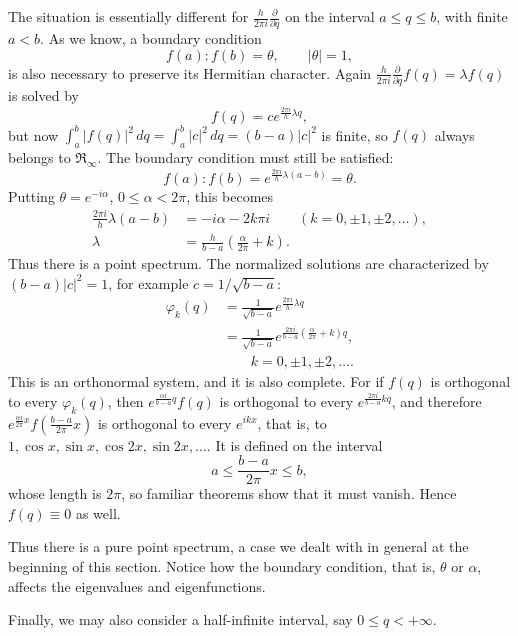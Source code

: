 \documentclass[fontsize=13pt,twoside,openany,headings=normal,parskip=false,bookmarkpackage=false,DIV=calc]{scrbook}
\begin{document}
\hypertarget{origpage-71}{}%
The situation is essentially different for $\frac{h}{2\pi i}\frac{\partial}{\partial q}$ on the interval $a\leq q\leq b$, with finite $a<b$. As we know, a boundary condition
\[
f(a):f(b)=\theta,\qquad|\theta|=1,
\]
is also necessary to preserve its Hermitian character. Again $\frac{h}{2\pi i}\frac{\partial}{\partial q}f(q)=\lambda f(q)$ is solved by
\[
f(q)=c e^{\frac{2\pi i}{h}\lambda q},
\]
but now $\int_a^b|f(q)|^2\,dq=\int_a^b|c|^2\,dq=(b-a)|c|^2$ is finite, so $f(q)$ always belongs to $\mathfrak{R}_\infty$. The boundary condition must still be satisfied:
\[
f(a):f(b)=e^{\frac{2\pi i}{h}\lambda(a-b)}=\theta.
\]
Putting $\theta=e^{-i\alpha}$, $0\leq\alpha<2\pi$, this becomes
\begin{align*}
\frac{2\pi i}{h}\lambda(a-b)&=-i\alpha-2k\pi i\qquad(k=0,\pm1,\pm2,\ldots),\\
\lambda&=\frac h{b-a}\left(\frac\alpha{2\pi}+k\right).
\end{align*}
Thus there is a point spectrum. The normalized solutions are characterized by $(b-a)|c|^2=1$, for example $c=1/\sqrt{b-a}$:
\begin{align*}
\varphi_k(q)&=\frac1{\sqrt{b-a}}e^{\frac{2\pi i}{h}\lambda q}\\
&=\frac1{\sqrt{b-a}}e^{\frac{2\pi i}{b-a}(\frac\alpha{2\pi}+k)q},\\
&\qquad k=0,\pm1,\pm2,\ldots.
\end{align*}
This is an orthonormal system, and it is also complete. For if $f(q)$ is orthogonal to every $\varphi_k(q)$, then $e^{\frac{\alpha i}{b-a}q}f(q)$ is orthogonal to every $e^{\frac{2\pi i}{b-a}kq}$, and therefore $e^{\frac{\alpha i}{2\pi}x}f(\frac{b-a}{2\pi}x)$ is orthogonal to every $e^{ikx}$, that is, to $1,\cos x,\sin x,\cos2x,\sin2x,\ldots$. It is defined on the interval
\[
a\leq\frac{b-a}{2\pi}x\leq b,
\]
whose length is $2\pi$, so familiar theorems show that it must vanish. Hence $f(q)\equiv0$ as well.

Thus there is a pure point spectrum, a case we dealt with in general at the beginning of this section. Notice how the boundary condition, that is, $\theta$ or $\alpha$, affects the eigenvalues and eigenfunctions.

Finally, we may also consider a half-infinite interval, say $0\leq q<+\infty$.
\end{document}
